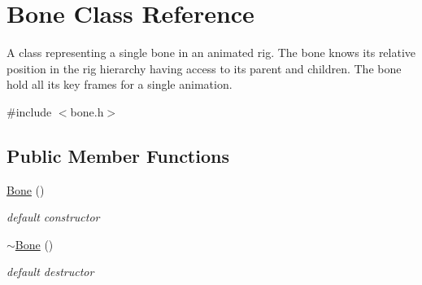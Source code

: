 \hypertarget{classBone}{}\section{Bone Class Reference}
\label{classBone}


A class representing a single bone in an animated rig. The bone knows its relative position in the rig hierarchy having access to its parent and children. The bone hold all its key frames for a single animation.  




{\ttfamily \#include $<$bone.\+h$>$}

\subsection*{Public Member Functions}
\begin{DoxyCompactItemize}
\item 
\hyperlink{classBone_ab0eb429b660fca66be1f97e6cc8de196}{Bone} ()\hypertarget{classBone_ab0eb429b660fca66be1f97e6cc8de196}{}\label{classBone_ab0eb429b660fca66be1f97e6cc8de196}

\begin{DoxyCompactList}\small\item\em default constructor \end{DoxyCompactList}\item 
\hyperlink{classBone_a8a85b84508716d1214f7fb69982d917c}{$\sim$\+Bone} ()\hypertarget{classBone_a8a85b84508716d1214f7fb69982d917c}{}\label{classBone_a8a85b84508716d1214f7fb69982d917c}

\begin{DoxyCompactList}\small\item\em default destructor \end{DoxyCompactList}\end{DoxyCompactItemize}
